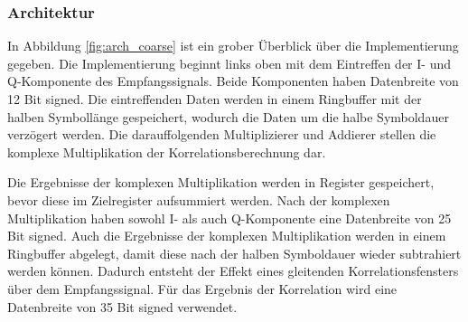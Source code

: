 \subsubsection{Architektur}

In Abbildung \ref{fig:arch_coarse} ist ein grober Überblick über die Implementierung gegeben. Die Implementierung beginnt links oben mit dem Eintreffen der I- und Q-Komponente des Empfangssignals. Beide Komponenten haben Datenbreite von 12 Bit signed. Die eintreffenden Daten werden in einem Ringbuffer mit der halben Symbollänge gespeichert, wodurch die Daten um die halbe Symboldauer verzögert werden. Die darauffolgenden Multiplizierer und Addierer stellen die komplexe Multiplikation der Korrelationsberechnung dar.

\begin{center}
\end{center}

Die Ergebnisse der komplexen Multiplikation werden in Register gespeichert, bevor diese im Zielregister aufsummiert werden. Nach der komplexen Multiplikation haben sowohl I- als auch Q-Komponente eine Datenbreite von 25 Bit signed. Auch die Ergebnisse der komplexen Multiplikation werden in einem Ringbuffer abgelegt, damit diese nach der halben Symboldauer wieder subtrahiert werden können. Dadurch entsteht der Effekt eines gleitenden Korrelationsfensters über dem Empfangssignal. Für das Ergebnis der Korrelation wird eine Datenbreite von 35 Bit signed verwendet. \vspace{0.5 cm}

